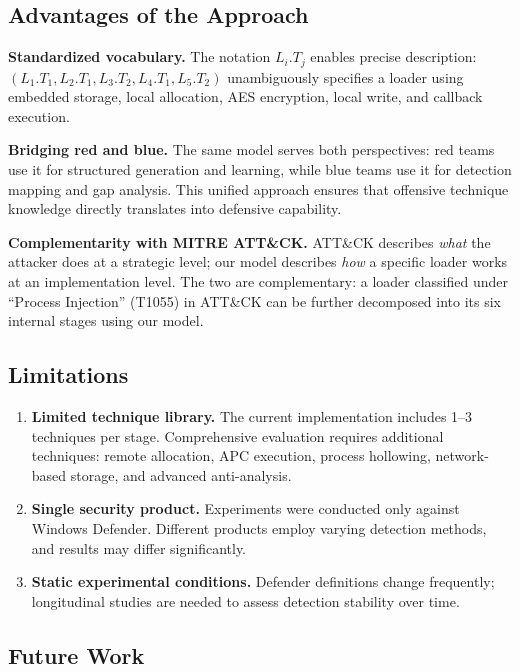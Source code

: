 \documentclass[10pt,a4paper,twocolumn]{article}
\begin{document}
\subsection{Advantages of the Approach}

\textbf{Standardized vocabulary.}
The notation $L_i.T_j$ enables precise description: $(L_1.T_1, L_2.T_1, L_3.T_2, L_4.T_1, L_5.T_2)$ unambiguously specifies a loader using embedded storage, local allocation, AES encryption, local write, and callback execution.

\textbf{Bridging red and blue.}
The same model serves both perspectives: red teams use it for structured generation and learning, while blue teams use it for detection mapping and gap analysis.
This unified approach ensures that offensive technique knowledge directly translates into defensive capability.

\textbf{Complementarity with MITRE ATT\&CK.}
ATT\&CK describes \textit{what} the attacker does at a strategic level; our model describes \textit{how} a specific loader works at an implementation level.
The two are complementary: a loader classified under ``Process Injection'' (T1055) in ATT\&CK can be further decomposed into its six internal stages using our model.

\subsection{Limitations}

\begin{enumerate}[leftmargin=*, itemsep=2pt]
    \item \textbf{Limited technique library.}
    The current implementation includes 1--3 techniques per stage.
    Comprehensive evaluation requires additional techniques: remote allocation, APC execution, process hollowing, network-based storage, and advanced anti-analysis.

    \item \textbf{Single security product.}
    Experiments were conducted only against Windows Defender.
    Different products employ varying detection methods, and results may differ significantly.

    \item \textbf{Static experimental conditions.}
    Defender definitions change frequently; longitudinal studies are needed to assess detection stability over time.
\end{enumerate}

\subsection{Future Work}
\end{document}

